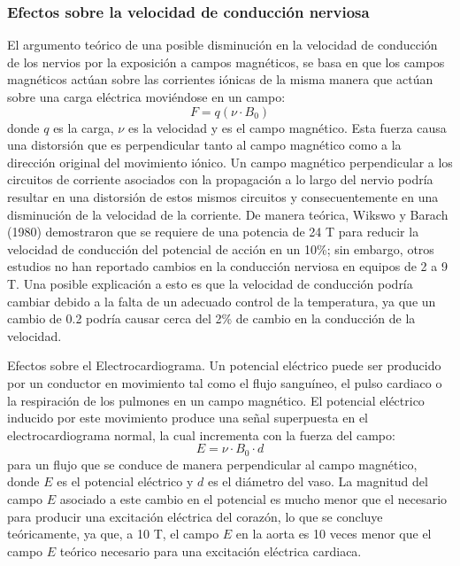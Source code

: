 \subsubsection{Efectos sobre la velocidad de conducción nerviosa}
El argumento teórico de una posible disminución en la velocidad de conducción de los nervios por la exposición a campos magnéticos, se basa en que los campos magnéticos actúan sobre las corrientes iónicas de la misma manera que actúan sobre una carga eléctrica moviéndose en un campo: 
\begin{equation}
 F = q(\nu \cdot B_0)
 \label{eq_F}
\end{equation}
donde $q$ es la carga, $\nu$ es la velocidad y \Bzero es el campo magnético. Esta fuerza causa una distorsión que es perpendicular tanto al campo magnético como a la dirección original del movimiento iónico. Un campo magnético perpendicular a los circuitos de corriente asociados con la propagación a lo largo del nervio podría resultar en una distorsión de estos mismos circuitos y consecuentemente en una disminución de la velocidad de la corriente. De manera teórica, Wikswo y Barach (1980) \cite{Wikswo_Barach_1980} demostraron que se requiere de una potencia de 24 T para reducir la velocidad de conducción del potencial de acción en un 10\%; sin embargo, otros estudios no han reportado cambios en la conducción nerviosa en equipos de 2 a 9 T. Una posible explicación a esto es que la velocidad de conducción podría cambiar debido a la falta de un adecuado control de la temperatura, ya que un cambio de 0.2\degrees \xspace podría causar cerca del 2\% de cambio en la conducción de la velocidad.

Efectos sobre el Electrocardiograma. Un potencial eléctrico puede ser producido por un conductor en movimiento tal como el flujo sanguíneo, el pulso cardiaco o la respiración de los pulmones en un campo magnético. El potencial eléctrico inducido por este movimiento produce una señal superpuesta en el electrocardiograma normal, la cual incrementa con la fuerza del campo:
\begin{equation}
 E=\nu \cdot B_0 \cdot d
\end{equation}
para un flujo que se conduce de manera perpendicular al campo magnético, donde $E$ es el potencial eléctrico y $d$ es el diámetro del vaso. La magnitud del campo $E$ asociado a este cambio en el potencial es mucho menor que el necesario para producir una excitación eléctrica del corazón, lo que se concluye teóricamente, ya que, a 10 T, el campo $E$ en la aorta es 10 veces menor que el campo $E$ teórico necesario para una excitación eléctrica cardiaca.

